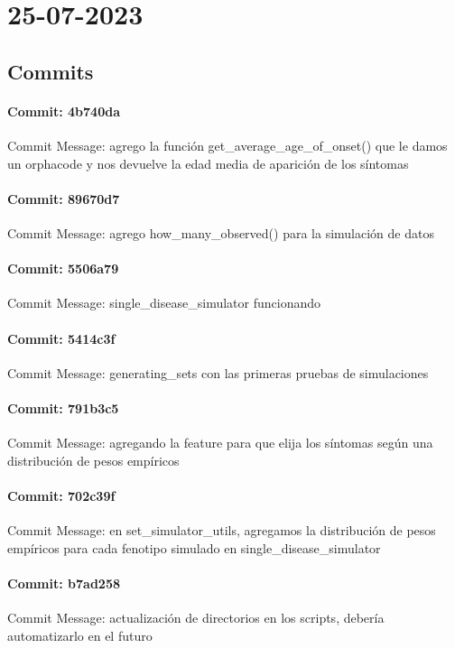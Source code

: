 \documentclass{article}
\begin{document}
\section{25-07-2023}
\subsection{Commits}
\paragraph{Commit: 4b740da}
Commit Message: agrego la función get_average_age_of_onset() que le damos un orphacode y nos devuelve la edad media de aparición de los síntomas

\paragraph{Commit: 89670d7}
Commit Message: agrego how_many_observed() para la simulación de datos

\paragraph{Commit: 5506a79}
Commit Message: single_disease_simulator funcionando

\paragraph{Commit: 5414c3f}
Commit Message: generating_sets con las primeras pruebas de simulaciones

\paragraph{Commit: 791b3c5}
Commit Message: agregando la feature para que elija los síntomas según una distribución de pesos empíricos

\paragraph{Commit: 702c39f}
Commit Message: en set_simulator_utils, agregamos la distribución de pesos empíricos para cada fenotipo simulado en single_disease_simulator

\paragraph{Commit: b7ad258}
Commit Message: actualización de directorios en los scripts, debería automatizarlo en el futuro
\end{document}
